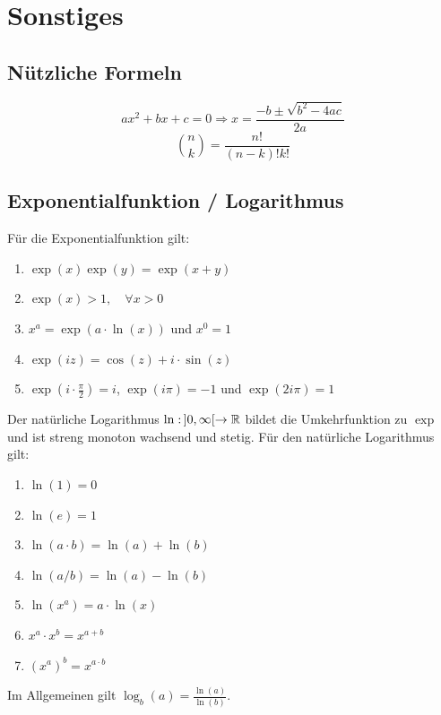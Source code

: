 \section{Sonstiges}


\subsection{Nützliche Formeln}

$$ax^2 + bx + c = 0 \Rightarrow x = \frac{-b \pm \sqrt{b^2 - 4ac}}{2a}$$
$$\binom{n}{k} = \frac{n!}{(n-k)!k!}$$





\subsection{Exponentialfunktion / Logarithmus}

Für die Exponentialfunktion gilt:
\begin{enumerate}[label = (\arabic*)]
	\item $\exp(x) \exp(y) = \exp(x+y)$
	\item $\exp(x) > 1, \quad \forall x > 0$
	\item $x^a = \exp(a \cdot \ln(x))$ und $x^0 = 1$
	\item $\exp(iz) = \cos(z) + i \cdot \sin(z)$
	\item $\exp(i \cdot \frac{\pi}{2}) = i$, $\exp(i \pi) = -1$ und $\exp(2 i \pi) = 1$
\end{enumerate}

Der natürliche Logarithmus $\ln : \, ]0, \infty[ \to \mathbb{R}$ bildet die Umkehrfunktion zu $\exp$ und ist
streng monoton wachsend und stetig. Für den natürliche Logarithmus gilt:

\begin{enumerate}[label = (\arabic*)]
	\item $\ln(1) = 0$
	\item $\ln(e) = 1$
	\item $\ln(a \cdot b) = \ln(a) + \ln(b)$
	\item $\ln(a / b) = \ln(a) - \ln(b)$
	\item $\ln(x^a) = a \cdot \ln(x)$
	\item $x^a \cdot x^b = x^{a + b}$
	\item $(x^a)^b = x^{a \cdot b}$
\end{enumerate}

Im Allgemeinen gilt $\log_b(a) = \frac{\ln(a)}{\ln(b)}$.


